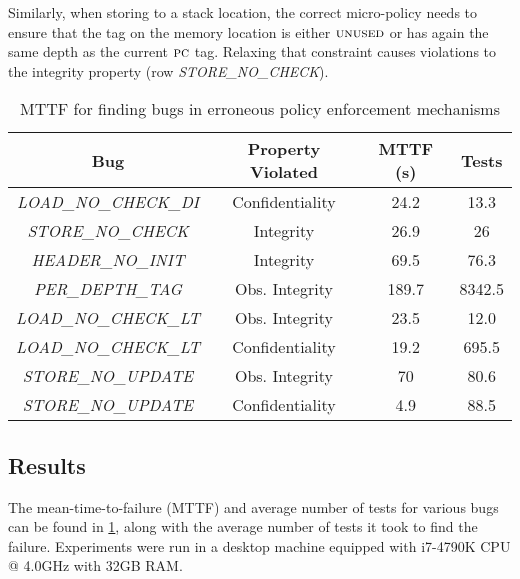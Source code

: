 \documentclass[10pt,conference]{ieeetran}%
\theoremstyle{definition}
\begin{document}
Similarly, when storing to a stack location, the correct micro-policy
needs to ensure that the tag on the memory location is either
$\textsc{unused}$ or has again the same depth as the current $\textsc{pc}$
tag. Relaxing that constraint causes violations to the integrity
property (row {\em STORE\_NO\_CHECK}).

\begin{table}[]
\centering
\begin{tabular}{c|c|c|c}
  Bug & Property Violated & MTTF (s) & Tests \\
  \hline
      {\em LOAD\_NO\_CHECK\_DI}  & Confidentiality & 24.2 & 13.3 \\
      {\em STORE\_NO\_CHECK} & Integrity & 26.9 & 26 \\
      {\em HEADER\_NO\_INIT} & Integrity & 69.5 & 76.3 \\
  \hline
  \hline
      {\em PER\_DEPTH\_TAG} & Obs. Integrity & 189.7 & 8342.5  \\
      {\em LOAD\_NO\_CHECK\_LT}  & Obs. Integrity & 23.5 & 12.0 \\
      {\em LOAD\_NO\_CHECK\_LT}  & Confidentiality & 19.2 & 695.5 \\
      {\em STORE\_NO\_UPDATE} & Obs. Integrity & 70 & 80.6  \\
      {\em STORE\_NO\_UPDATE} & Confidentiality & 4.9 & 88.5 \\
  \hline
\end{tabular}
\vspace*{1em}
\caption{MTTF for finding bugs in erroneous policy enforcement mechanisms}
\vspace*{-2em}
\label{tab:bug-table}
\end{table}

\subsection{Results}

The mean-time-to-failure (MTTF) and average number of tests for various bugs can be found in
\cref{tab:bug-table}, along with the average number of tests
it took to find the failure. Experiments were run in a desktop
machine equipped with i7-4790K CPU @ 4.0GHz with 32GB RAM.
\end{document}
